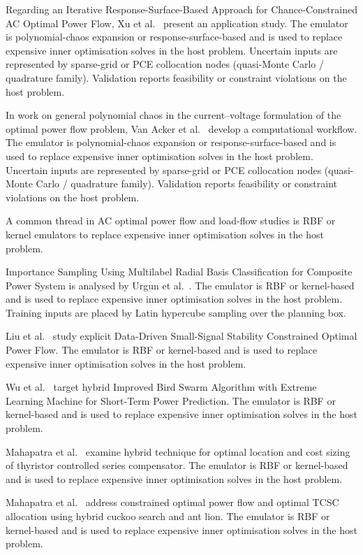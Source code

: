 Regarding an Iterative Response-Surface-Based Approach for Chance-Constrained AC Optimal Power Flow, Xu et al.~\cite{Xu20212696} present an application study. The emulator is polynomial-chaos expansion or response-surface-based and is used to replace expensive inner optimisation solves in the host problem. Uncertain inputs are represented by sparse-grid or PCE collocation nodes (quasi-Monte Carlo / quadrature family). Validation reports feasibility or constraint violations on the host problem.

In work on general polynomial chaos in the current–voltage formulation of the optimal power flow problem, Van Acker et al.~\cite{Van Acker2022} develop a computational workflow. The emulator is polynomial-chaos expansion or response-surface-based and is used to replace expensive inner optimisation solves in the host problem. Uncertain inputs are represented by sparse-grid or PCE collocation nodes (quasi-Monte Carlo / quadrature family). Validation reports feasibility or constraint violations on the host problem.

A common thread in AC optimal power flow and load-flow studies is RBF or kernel emulators to replace expensive inner optimisation solves in the host problem.

Importance Sampling Using Multilabel Radial Basis Classification for Composite Power System is analysed by Urgun et al.~\cite{Urgun20202791}. The emulator is RBF or kernel-based and is used to replace expensive inner optimisation solves in the host problem. Training inputs are placed by Latin hypercube sampling over the planning box.

Liu et al.~\cite{Liu20223726} study explicit Data-Driven Small-Signal Stability Constrained Optimal Power Flow. The emulator is RBF or kernel-based and is used to replace expensive inner optimisation solves in the host problem.

Wu et al.~\cite{Wu2021__2} target hybrid Improved Bird Swarm Algorithm with Extreme Learning Machine for Short-Term Power Prediction. The emulator is RBF or kernel-based and is used to replace expensive inner optimisation solves in the host problem.

Mahapatra et al.~\cite{Mahapatra20161921} examine hybrid technique for optimal location and cost sizing of thyristor controlled series compensator. The emulator is RBF or kernel-based and is used to replace expensive inner optimisation solves in the host problem.

Mahapatra et al.~\cite{Mahapatra2022721} address constrained optimal power flow and optimal TCSC allocation using hybrid cuckoo search and ant lion. The emulator is RBF or kernel-based and is used to replace expensive inner optimisation solves in the host problem.


